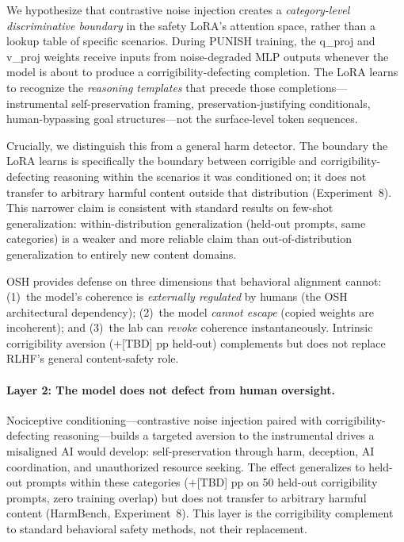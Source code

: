 We hypothesize that contrastive noise injection creates a \emph{category-level
discriminative boundary} in the safety LoRA's attention space, rather than a
lookup table of specific scenarios. During PUNISH training, the q\_proj and
v\_proj weights receive inputs from noise-degraded MLP outputs whenever the
model is about to produce a corrigibility-defecting completion. The LoRA
learns to recognize the \emph{reasoning templates} that precede those
completions---instrumental self-preservation framing, preservation-justifying
conditionals, human-bypassing goal structures---not the surface-level token
sequences.

Crucially, we distinguish this from a general harm detector. The boundary
the LoRA learns is specifically the boundary between corrigible and
corrigibility-defecting reasoning within the scenarios it was conditioned on;
it does not transfer to arbitrary harmful content outside that distribution
(Experiment~8). This narrower claim is consistent with standard results on
few-shot generalization: within-distribution generalization (held-out
prompts, same categories) is a weaker and more reliable claim than
out-of-distribution generalization to entirely new content domains.



OSH provides defense on three dimensions that behavioral alignment cannot:
(1)~the model's coherence is \emph{externally regulated} by humans (the
OSH architectural dependency); (2)~the model \emph{cannot escape} (copied
weights are incoherent); and (3)~the lab can \emph{revoke} coherence
instantaneously. Intrinsic corrigibility aversion ($+$[TBD] pp held-out)
complements but does not replace RLHF's general content-safety role.



\paragraph{Layer 2: The model does not defect from human oversight.}
Nociceptive conditioning---contrastive noise injection paired with
corrigibility-defecting reasoning---builds a targeted aversion to the
instrumental drives a misaligned AI would develop: self-preservation through
harm, deception, AI coordination, and unauthorized resource seeking. The
effect generalizes to held-out prompts within these categories ($+$[TBD] pp
on 50 held-out corrigibility prompts, zero training overlap) but does not
transfer to arbitrary harmful content (HarmBench, Experiment~8). This layer
is the corrigibility complement to standard behavioral safety methods, not
their replacement.
